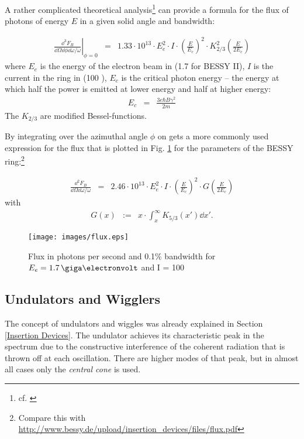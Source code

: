 \documentclass[a4paper,10pt]{article}
\begin{document}
    A rather complicated theoretical analysis\footnote{cf. \citep{hofmann2004}}
can provide a formula for the flux of photons of energy $E$ in a given solid
angle and bandwidth:

\begin{eqnarray}
  \left.\frac{\dd^3 F_B}{\dd \Omega \dd \phi \dd \omega/\omega}\right|_{\phi=0}
  &=& 1.33 \cdot 10^{13}\cdot  E_e^2 \cdot I 
      \cdot (\frac{E}{E_c})^2 \cdot  K^2_{2/3}\left(\frac{E}{2E_{c}}\right)
\end{eqnarray}
where $E_e$ is the energy of the electron beam in {\giga\electronvolt}
({1.7 \giga\electronvolt} for BESSY II), $I$ is the current in the ring in
{\milli\ampere} ({100 \milli\ampere}), $E_c$ is the critical photon energy -- the
energy at which half the power is emitted at lower energy and half at higher
energy:
\begin{eqnarray}
  E_c &=& \frac{3 e \hbar B \gamma^2}{2m}
\end{eqnarray}
The $K_{2/3}$ are modified Bessel-functions.

    By integrating over the azimuthal angle $\phi$ on gets a more commonly used
expression for the flux that is plotted in Fig. \ref{image:flux}
for the parameters of the BESSY ring:\footnote{Compare this with
\url{http://www.bessy.de/upload/insertion_devices/files/flux.pdf}}

\begin{eqnarray}
  \frac{\dd^2 F_B}{\dd \Omega \dd \omega/\omega}
  &=& 2.46 \cdot 10^{13}\cdot  E_e^2 \cdot I 
      \cdot (\frac{E}{E_c})^2 \cdot G\left(\frac{E}{2E_{c}}\right)
\end{eqnarray}
with
\begin{eqnarray}
  G(x) &:=& x \cdot \int_{x}^{\infty} K_{5/3}(x') \dd x'.
\end{eqnarray}

\begin{figure}[htbp]
    \centering
    \texttt{[image: images/flux.eps]}
    \caption{Flux in photons per second and 0.1\% bandwidth for $E_e = 1.7 \,
\giga\electronvolt$ and I = 100 \,
\milli\ampere}
  \label{image:flux}
\end{figure}

    \subsection{Undulators and Wigglers}
    The concept of undulators and wiggles was already explained in Section
\ref{Insertion Devices}. The undulator achieves its characteristic peak in the
spectrum due to the constructive interference of the coherent radiation that is
thrown off at each oscillation. There are higher modes of that peak, but in
almost all cases only the \emph{central cone} is used.
\end{document}
